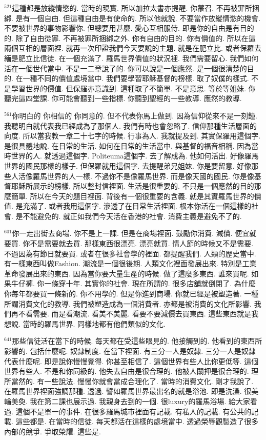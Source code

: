 \documentclass{book}
\begin{document}
$^{521}$這種都是放縱情慾的.
當時的現實.
所以加拉太書亦提醒.
你蒙召.
不再被罪所捆綁.
是有一個自由.
但這種自由是有使命的.
所以他就說.
不要當作放縱情慾的機會.
不要被世界的事物影響你.
但總要用甚麼.
愛心互相服侍.
即是你的自由是有目的的.
除了自由從罪.
不再被罪所捆綁之外.
你有自由的目的.
你有價值的.
所以在這兩個互相的層面裡.
就再一次印證我們今天要說的主題.
就是在肥立比.
或者保羅去緬是肥立比信徒.
在一個充滿了.
羅馬世界價值的狀況裡.
我們需要留心.
我們如何活在一個世代當中.
不是一二章說了的.
你可以說是一個應然.
是一個很清楚的目的.
在一種不同的價值處境當中.
我們要學習耶穌基督的榜樣.
取了奴僕的樣式.
不是學習世界的價值.
但保羅亦意識到.
這種取了不簡單.
不是意思.
等於等姐妹.
你聽完這四堂課.
你可能會聽到一些指標.
你聽到聖經的一些教導.
應然的教導.

$^{561}$你明白的 你相信的 你同意的.
但不代表你馬上做到.
因為信仰從來不是一刻鐘.
我聽明白就代表我已經成為了那個人.
我們有時也會忽略了.
信仰那種生活層面的向度.
所以當我教一章二十七字的時候.
行事為人.
我就提及到.
其實保羅用這個字.
是很具體地說.
在日常的生活.
如何在日常的生活當中.
與基督的福音相稱.
因為當時世界的人.
就透過這個字.
Politeuma這個字.
去了解成為.
他如何活出.
好像羅馬世界的國民那樣的樣子.
但保羅就用這個字.
去提醒弟兄姐妹.
你是要留意.
好像那些人活像羅馬世界的人一樣.
不過你不是像羅馬世界.
而是像天國的國民.
你是像基督耶穌所展示的榜樣.
所以整封信裡面.
生活是很重要的.
不只是一個應然的目的那麼簡單.
所以在今天的題目裡面.
背後有一個很重要的含義.
就是其實羅馬世界的價值.
是充滿了.
或者我用這個字.
滲透了在日常生活裡面.
根本你活在一個這樣的社會.
是不能避免的.
就正如我們今天活在香港的社會.
消費主義是避免不了的.

$^{601}$你一走出街去商場.
你不是上一課.
但是在商場裡面.
鼓勵你消費.
減價.
便宜就要買.
你不是需要就去買.
那樣東西很漂亮.
漂亮就買.
情人節的時候又不是需要.
不過因為有節日就要買.
或者在很多社會學的裡面.
都提醒我們.
人類的歷史當中.
有一樣東西叫做Fashion.
潮流是一個很後期.
人類文化裡面發展出來.
特別是工業革命發展出來的東西.
因為當你要大量生產的時候.
做了這麼多東西.
誰來買呢.
如果牛仔褲.
你一條穿十年.
其實你的社會.
現在所謂的.
很多店舖就倒閉了.
為什麼你每年都要買一條新的.
你不用學的.
但是你進到商場.
你就已經是被塑造著.
一種所謂消費文化的教導.
我們被塑造成為一個消費者.
亦都是被消費的文化所影響.
我們再不看需要.
而是看潮流.
看美不美麗.
看要不要減價去買東西.
這些東西就是我想說.
當時的羅馬世界.
同樣地都有他們類似的文化.

$^{641}$那些信徒活在當下的時候.
每天都在受這些眼見的.
他接觸到的.
他看到的東西所影響的.
包括什麼呢.
奴隸制度.
在當下裡面.
有三分一人是奴隸.
三分一人是奴隸代表什麼呢.
即是說你慢慢覺得.
你甚至相信了.
這個世界有些人比你更低等.
這個世界有些人.
不是和你同級的.
他失去自由是很合理的.
他被人關押是很合理的.
理所當然的.
有一些說法.
慢慢你就會當成合理化了.
當時的消費文化.
剛才我說了.
在羅馬世界裡面強調那種.
透過.
譬如羅馬世界最出名的就是浴池.
即是洗澡.
很美輪美奐.
我在第二課也展示過.
我親身去到的一個.
很luxury的羅馬浴場.
給大家看過.
這個不是單一的事件.
在很多羅馬城市裡面有記載.
有私人的記載.
有公共的記載.
這些都是.
在當時的信徒.
每天都活在這樣的處境當中.
透過榮辱觀製造了很多內部的競爭.
爭取榮耀.
這些是.
\end{document}

